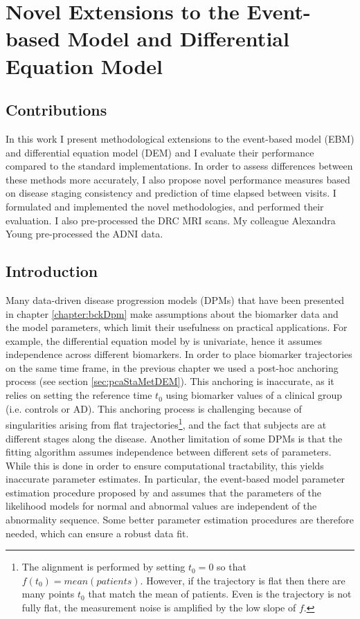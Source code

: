 \chapter[Novel Extensions to the EBM and DEM]{Novel Extensions to the Event-based Model and Differential Equation Model}
\label{chapter:perf}

\section{Contributions}

In this work I present methodological extensions to the event-based model (EBM) and differential equation model (DEM) and I evaluate their performance compared to the standard implementations. In order to assess differences between these methods more accurately, I also propose novel performance measures based on disease staging consistency and prediction of time elapsed between visits. I formulated and implemented the novel methodologies, and performed their evaluation. I also pre-processed the DRC MRI scans. My colleague Alexandra Young pre-processed the ADNI data. 

\section{Introduction}

Many data-driven disease progression models (DPMs) that have been presented in chapter \ref{chapter:bckDpm} make assumptions about the biomarker data and the model parameters, which limit their usefulness on practical applications. For example, the differential equation model by \cite{villemagne2013amyloid} is univariate, hence it assumes independence across different biomarkers. In order to place biomarker trajectories on the same time frame, in the previous chapter we used a post-hoc anchoring process (see section \ref{sec:pcaStaMetDEM}). This anchoring is inaccurate, as it relies on setting the reference time $t_0$ using biomarker values of a clinical group (i.e. controls or AD). This anchoring process is challenging because of singularities arising from flat trajectories\footnote{The alignment is performed by setting $t_0=0$ so that $f(t_0) = mean(patients)$. However, if the trajectory is flat then there are many points  $t_0$ that match the mean of patients. Even is the trajectory is not fully flat, the measurement noise is amplified by the low slope of $f$.}, and the fact that subjects are at different stages along the disease. Another limitation of some DPMs is that the fitting algorithm assumes independence between different sets of parameters. While this is done in order to ensure computational tractability, this yields inaccurate parameter estimates. In particular, the event-based model parameter estimation procedure proposed by \cite{fonteijn2012event} and \cite{young2014data} assumes that the parameters of the likelihood models for normal and abnormal values are independent of the abnormality sequence. Some better parameter estimation procedures are therefore needed, which can ensure a robust data fit.

